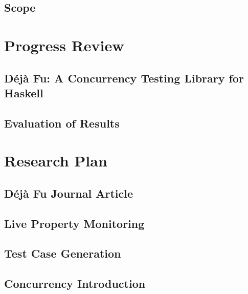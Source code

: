\documentclass[openright, dottedtoc, headinclude, footinclude=true, a4paper, numbers=noenddot, fontsize=10pt]{scrreprt}
\newcommand{\dejafu}{D\'{e}j\`{a} Fu}
\begin{document}
  \section{Scope}
  \label{sec:intro-scope}
  

\chapter{Progress Review}
\label{chp:progress}


  \section{\dejafu{}: A Concurrency Testing Library for Haskell}
  \label{sec:progress-dejafu}
  

  \section{Evaluation of Results}
  \label{sec:progress-evaluation}
  

\chapter{Research Plan}
\label{chp:plan}


  \section{\dejafu{} Journal Article}
  \label{sec:plan-journal}
  

  \section{Live Property Monitoring}
  \label{sec:plan-ltl}
  

  \section{Test Case Generation}
  \label{sec:plan-quickspec}
  

  \section{Concurrency Introduction}
  \label{sec:plan-searchparty}
  
\end{document}

